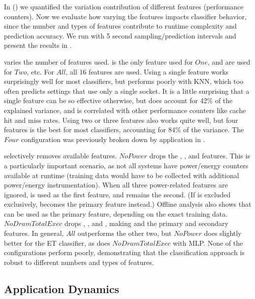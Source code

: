 In  () we quantified the variation contribution of different features (performance counters).
Now we evaluate how varying the features impacts classifier behavior, since the number and types of features contribute to runtime complexity and prediction accuracy.
We run with 5 second sampling/prediction intervals and present the results in .

 varies the number of features used.
 is the only feature used for $One$,  and  are used for $Two$, etc.
For $All$, all 16 features are used.
Using a single feature works surprisingly well for most classifiers, but performs poorly with KNN, which too often predicts settings that use only a single socket.
It is a little surprising that a single feature can be so effective otherwise, but  does account for 42\% of the explained variance, and is correlated with other performance counters like cache hit and miss rates.
Using two or three features also works quite well, but four features is the best for most classifiers, accounting for 84\% of the variance.
The $Four$ configuration was previously broken down by application in .

 selectively removes available features.
$NoPower$ drops the , , and  features.
This is a particularly important scenario, as not all systems have power/energy counters available at runtime (training data would have to be collected with additional power/energy instrumentation).
When all three power-related features are ignored,  is used as the first feature, and  remains the second.
(If  is excluded exclusively,  becomes the primary feature instead.)
Offline analysis also shows that  can be used as the primary feature, depending on the exact training data.
$NoDramTotalExec$ drops , , and , making  and  the primary and secondary features.
In general, $All$ outperforms the other two, but $NoPower$ does slightly better for the ET classifier, as does $NoDramTotalExec$ with MLP.
None of the configurations perform poorly, demonstrating that the classification approach is robust to different numbers and types of features.


\subsection{Application Dynamics}
\label{sec:eval-dynamics}


